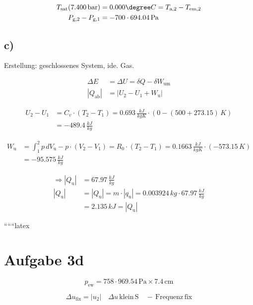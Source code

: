 \begin{align*}
T_{\text{sat}} (7.400 \, \text{bar}) & = 0.000 \degree C = T_{\text{a,2}} - T_{\text{em,2}} \\
P_{\text{g,2}} - P_{\text{g,1}} & = -700 \cdot 694.04 \, \text{Pa}
\end{align*}

\subsection*{c)}

Erstellung: geschlossenes System, ide. Gas.

\begin{align*}
\Delta E & = \Delta U = \delta Q - \delta W_{\text{um}} \\
\left| Q_{\text{ab}} \right| & = \left| U_2 - U_1 + W_{\text{u}} \right|
\end{align*}

\begin{align*}
U_2 - U_1 & = C_v \cdot (T_2 - T_1) = 0.693 \, \frac{kJ}{kgK} \cdot (0 - (500 + 273.15) \, K) \\
& = -489.4 \, \frac{kJ}{kg}
\end{align*}

\begin{align*}
W_{\text{u}} & = \int_{1}^{2} p \, dV_{\text{u}} - p \cdot (V_2 - V_1) = R_0 \cdot (T_2 - T_1) = 0.1663 \, \frac{kJ}{kgK} \cdot (-573.15 \, K) \\
& = -95.575 \, \frac{kJ}{kg}
\end{align*}

\begin{align*}
\Rightarrow \left| Q_{\text{u}} \right| & = 67.97 \, \frac{kJ}{kg} \\
\left| Q_{\text{u}} \right| & = \left| Q_{\text{u}} \right| = m \cdot \left| q_{\text{u}} \right| = 0.003924 \, kg \cdot 67.97 \, \frac{kJ}{kg} \\
& = 2.135 \, kJ = \left| Q_{\text{u}} \right|
\end{align*}

``````latex


\section*{Aufgabe 3d}

\[
p_{\text{ew}} = 758 \cdot 969.54 \, \text{Pa} \times 7.4 \, \text{cm}
\]

\[
\Delta u_{\text{fix}} = \left| u_{2} \right| \quad \Delta u \, \text{klein} \, \text{S} \quad - \, \text{Frequenz} \, \text{fix}
\]

